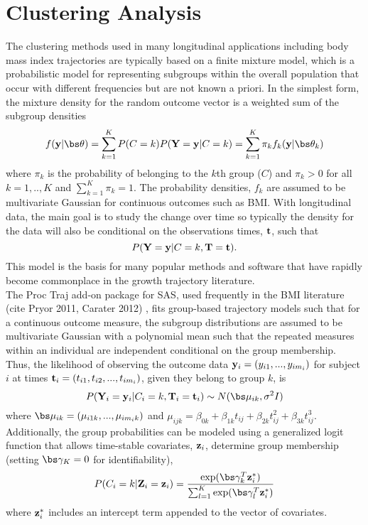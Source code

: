\section{Clustering Analysis}
The clustering methods used in many longitudinal applications including body mass index trajectories are typically based on a finite mixture model, which is a probabilistic model for representing subgroups within the overall population that occur with different frequencies but are not known a priori. In the simplest form, the mixture density for the random outcome vector is a weighted sum of the subgroup densities
$$f(\B y|\bs\theta) = \sum^{K}_{k=1}P(C=k)P(\B Y=\B y|C=k) = \sum^{K}_{k=1}\pi_{k}f_{k}(\B y|\bs\theta_{k})$$
where $\pi_{k}$ is the probability of belonging to the $k$th group ($C$) and $\pi_{k}>0$ for all $k=1,..,K$ and $\sum^{K}_{k=1}\pi_{k}=1$. The probability densities, $f_{k}$ are assumed to be multivariate Gaussian for continuous outcomes such as BMI. With longitudinal data, the main goal is to study the change over time so typically the density for the data will also be conditional on the observations times, $\mathbf t$, such that $$P(\mathbf Y =\mathbf y |C=k,\mathbf T = \mathbf t).$$
This model is the basis for many popular methods and software that have rapidly become commonplace in the growth trajectory literature.\\

The Proc Traj add-on package for SAS, used frequently in the BMI literature (cite Pryor 2011, Carater 2012) , fits group-based trajectory models such that for a continuous outcome measure, the subgroup distributions are assumed to be multivariate Gaussian with a polynomial mean such that the repeated measures within an individual are independent conditional on the group membership. Thus, the likelihood of observing the outcome data $\mathbf y_{i} = (y_{i1},...,y_{im_{i}})$ for subject $i$ at times $\mathbf t_{i} = (t_{i1},t_{i2},...,t_{im_{i}})$, given they belong to group $k$, is
$$P(\B Y_{i} = \B y_{i}|C_{i}=k,\B T_{i}=\B t_{i})\sim N(\bs\mu_{ik},\sigma^{2}I)$$
where $\bs\mu_{ik} = (\mu_{i1k},...,\mu_{im_{i}k})$ and $\mu_{ijk} = \beta_{0k}+\beta_{1k} t_{ij} + \beta_{2k}t_{ij}^{2}+ \beta_{3k} t_{ij}^{3}$. Additionally, the group probabilities can be modeled using a generalized logit function that allows time-stable covariates, $\mathbf z_{i}$, determine group membership (setting $\bs\gamma_{K}=0$ for identifiability),
$$P(C_{i}=k|\B Z_{i}=\B z_{i}) = \frac{\exp(\bs\gamma_{k}^{T}\B z^{*}_{i})}{\sum^{K}_{l=1}\exp(\bs\gamma_{l}^{T}\B z^{*}_{i})}$$
where $\mathbf z^{*}_{i} $ includes an intercept term appended to the vector of covariates. \\


